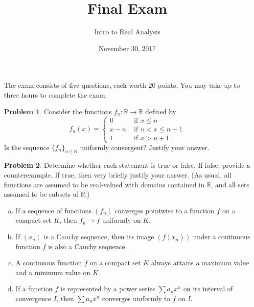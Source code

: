 \documentclass{amsart}
\newcommand{\+}[1]{\ensuremath{\mathbf{#1}}}
\newcommand{\R}{{\mathbb R}}
\theoremstyle{definition}
\newtheorem{prob}{Problem}
\begin{document}
\title{Final Exam}
\date{November 30, 2017}
\author{Intro to Real Analysis}

\maketitle


The exam consists of five questions, each worth $20$ points.
You may take up to three hours to complete the exam.

\vspace{3mm}



\begin{prob}
Consider the functions $f_n: \R \to \R$ defined by
\[
f_n(x) = 
\begin{cases}
 0 &\text{ if } x \leq n \\
 x-n &\text{ if } n < x \leq n+1 \\
 1 &\text{ if } x > n+1.
\end{cases}
\]
 Is the sequence $\{f_n\}_{n \in \mathbb{N}}$ uniformly convergent?
Justify your answer.
 \end{prob}

 
\vspace{3mm}


\begin{prob} Determine whether each statement is true or false.
If false, provide a counterexample.  If true, then very briefly justify
your answer.
(As usual, all functions are assumed to be real-valued
with domains contained in $\R$,
and all sets assumed to be subsets of $\R$.)
 \begin{enumerate}[(a)]
  \item If a sequence of functions $(f_n)$ converges pointwise
  to a function $f$ on a compact set $K$, then
  $f_n \to f$ uniformly on $K$.
  \item If $(x_n)$ is a Cauchy sequence, then its
  image $(f(x_n))$ under a continuous function $f$
  is also a Cauchy sequence.
  \item A continuous function $f$ on a compact set $K$
  always attains a maximum value and a minimum value on $K$.
  \item If a function $f$ is represented
  by a power series $\sum a_n x^n$
  on its interval of convergence $I$,
  then $\sum a_n x^n$ converges uniformly
  to $f$ on $I$.
 \end{enumerate}
\end{prob}


\vspace{3mm}
\end{document}
